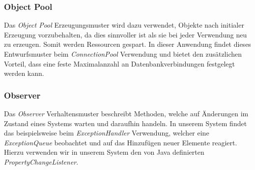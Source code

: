 \subsubsection{Object Pool}
Das \emph{Object Pool} Erzeugungsmuster wird dazu verwendet, Objekte nach initialer Erzeugung
vorzubehalten, da dies sinnvoller ist als sie bei jeder Verwendung neu zu erzeugen.
Somit werden Ressourcen gespart. In dieser Anwendung findet dieses Entwurfsmuster
beim \emph{ConnectionPool} %
Verwendung und bietet den zusätzlichen Vorteil, dass eine feste Maximalanzahl an
Datenbankverbindungen festgelegt werden kann.

\subsubsection{Observer}
Das \emph{Observer} Verhaltensmuster beschreibt Methoden, welche auf
Änderungen im Zustand eines Systems warten und daraufhin handeln.
In unserem System findet das beispielsweise beim \emph{ExceptionHandler} %
Verwendung, welcher eine \emph{ExceptionQueue} beobachtet und auf das Hinzufügen neuer Elemente
reagiert.
Hierzu verwenden wir in unserem System den von Java definierten \emph{PropertyChangeListener}.